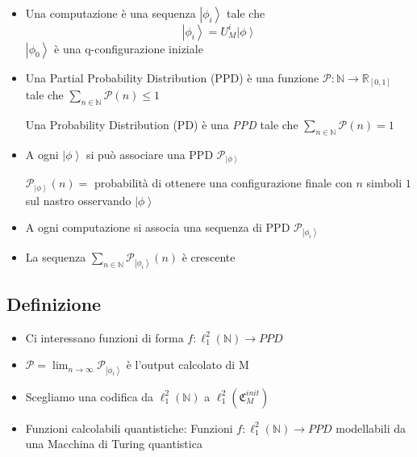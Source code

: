 \documentclass{beamer}
\newcommand{\ket}[1]{\left | #1 \right \rangle}
\newcommand{\conf}{\mathfrak{C}_{M}}
\newcommand{\hil}{\ell^{2}}
\newcommand{\hiluninorm}{\hil_{1}}
\begin{document}
\begin{frame}{\secname}{\subsecname}
	\begin{itemize}
		\item<+-> Una \alert{computazione} è una sequenza \(\ket{\phi_{i}}\) tale che
		\[\ket{\phi_{i}} = U_{M}^{i}\ket{\phi}\] %
		\(\ket{\phi_{0}}\) è una q-configurazione iniziale
		\item<+-> Una \alert{\foreignlanguage{english}{Partial Probability Distribution} (PPD)} è una funzione \( \mathcal{P} : \mathbb{N} \rightarrow \mathbb{R}_{[0,1]} \) tale che \( \sum_{n \in \mathbb{N}} \mathcal{P} \left ( n \right ) \le 1 \)\par
		Una \alert{\foreignlanguage{english}{Probability Distribution} (PD)} è una \textit{PPD} tale che \( \sum_{n \in \mathbb{N}} \mathcal{P} \left ( n \right ) = 1 \)
		\item<+-> A ogni \( \ket{\phi} \) si può associare una PPD \( \mathcal{P}_{\ket{\phi}} \)\par
		\( \mathcal{P}_{\ket{\phi}} \left ( n \right ) = \) probabilità di ottenere una configurazione finale con \(n\) simboli \(1\) sul nastro osservando \( \ket{\phi} \)
		\item<+-> A ogni computazione si associa una sequenza di PPD \( \mathcal{P}_{\ket{\phi_{i}}} \)
		\item<+-> La sequenza \(\sum_{n \in \mathbb{N}} \mathcal{P}_{\ket{\phi_{i}}} \left ( n \right )\) è crescente
	\end{itemize}
\end{frame}

\subsection{Definizione}

\begin{frame}{\secname}{\subsecname}
	\begin{itemize}
		\item<1-> Ci interessano funzioni di forma \( f : \hiluninorm \left ( \mathbb{N} \right ) \rightarrow PPD \)
		\item<2-> \( \mathcal{P} = \lim_{n \to \infty} \mathcal{P}_{\ket{\phi_{i}}} \) è l'\alert{output calcolato} di M
		\item<2-> Scegliamo una codifica da \( \hiluninorm \left ( \mathbb{N} \right ) \) a \( \hiluninorm \left ( \conf^{init} \right ) \)
		\item<3-> \alert{Funzioni calcolabili quantistiche}: Funzioni \( f : \hiluninorm \left ( \mathbb{N} \right ) \rightarrow PPD \) modellabili da una Macchina di Turing quantistica
	\end{itemize}
\end{frame}
\end{document}
